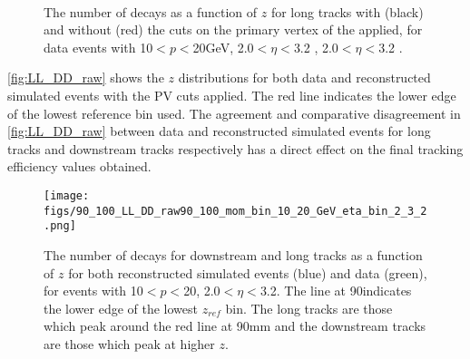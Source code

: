 \begin{figure}
\centering
  \hspace*{-1cm}
     \\
   \caption{The number of decays as a function of $z$ for long tracks with (black) and without (red) the cuts on the primary vertex of the \KS applied, for data  events with 10$<p<$20\:GeV, 2.0$<\eta<$3.2 \protect{}, 2.0$<\eta<$3.2 \protect{}.
  \label{fig:pvcut}}
\end{figure}


\autoref{fig:LL_DD_raw} shows the $z$ distributions for both data and reconstructed simulated events with the PV cuts applied. The red line indicates the lower edge of the lowest reference bin used. The agreement and comparative disagreement in \autoref{fig:LL_DD_raw} between data and reconstructed simulated events for long tracks and downstream tracks respectively has a direct effect on the final tracking efficiency values obtained. %



\begin{figure}[h]
\centering
\texttt{[image: figs/90\_100\_LL\_DD\_raw90\_100\_mom\_bin\_10\_20\_GeV\_eta\_bin\_2\_3\_2.png]}
\caption{The number of decays for downstream and long tracks as a function of $z$ for both reconstructed simulated events (blue) and data (green), for events with 10$<p<$20\:\gevc, 2.0$<\eta<$3.2. The line at 90\mm indicates the lower edge of the lowest $z_{ref}$ bin. The long tracks are those which peak around the red line at 90\:mm and the downstream tracks are those which peak at higher $z$.}
\label{fig:LL_DD_raw}
\end{figure}







